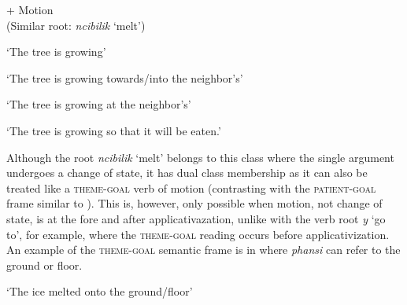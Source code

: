 \documentclass[output=paper]{langsci/langscibook}
\begin{document}
\ea\label{ex:sibanda:13}
\settowidth{}
 {+ Motion}\\
 (Similar root: \textit{ncibilik} ‘melt’)\\

\glt ‘The tree is growing’


\glt ‘The tree is growing towards/into the neighbor’s’


\glt ‘The tree is growing at the neighbor’s’ 


\glt ‘The tree is growing so that it will be eaten.’ 
\z
\z

Although the root \textit{ncibilik} ‘melt’ belongs to this class where the single argument undergoes a change of state, it has dual class membership as it can also be treated like a \textsc{theme-goal} verb of motion (contrasting with the \textsc{patient-goal} frame similar to ). This is, however, only possible when motion, not change of state, is at the fore and after applicativazation, unlike with the verb root \textit{y} ‘go to’, for example, where the \textsc{theme-goal} reading occurs before applicativization. An example of the \textsc{theme-goal} semantic frame is in  where \textit{phansi} can refer to the ground or floor. 

\glt ‘The ice melted onto the ground/floor’
\z
\end{document}
